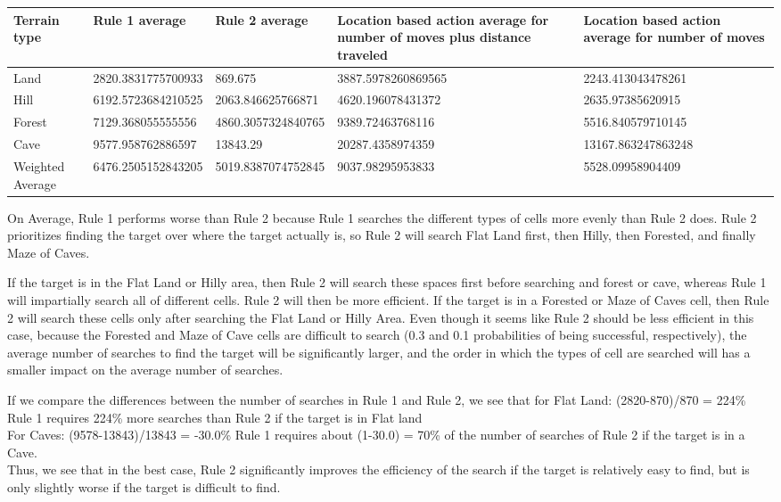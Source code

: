 \documentclass[a4paper]{article}
\begin{document}
\begin{enumerate}
\begin{center}
\begin{tabular}{|m{4em}|m{9em}|m{9em}|m{12em}|m{9em}|}
\hline
Terrain type & Rule 1 average & Rule 2 average & Location based action average for number of moves plus distance traveled & Location based action average for number of moves\\
\hline
Land & 2820.3831775700933 & 869.675 & 3887.5978260869565 & 2243.413043478261\\
\hline
Hill & 6192.5723684210525 & 2063.846625766871 & 4620.196078431372 & 2635.97385620915\\
\hline
Forest & 7129.368055555556 & 4860.3057324840765 & 9389.72463768116 & 5516.840579710145\\
\hline
Cave & 9577.958762886597 & 13843.29 & 20287.4358974359 & 13167.863247863248\\
\hline
Weighted Average & 6476.2505152843205 & 5019.8387074752845 & 9037.98295953833 & 5528.09958904409\\
\hline
\end{tabular}
\end{center}
\bigskip
\bigskip
On Average, Rule 1 performs worse than Rule 2 because Rule 1 searches the different types of cells more evenly than Rule 2 does. Rule 2 prioritizes finding the target over where the target actually is, so Rule 2 will search Flat Land first, then Hilly, then Forested, and finally Maze of Caves. 

If the target is in the Flat Land or Hilly area, then Rule 2 will search these spaces first before searching and forest or cave, whereas Rule 1 will impartially search all of different cells. Rule 2 will then be more efficient. If the target is in a Forested or Maze of Caves cell, then Rule 2 will search these cells only after searching the Flat Land or Hilly Area. Even though it seems like Rule 2 should be less efficient in this case, because the Forested and Maze of Cave cells are difficult to search (0.3 and 0.1 probabilities of being successful, respectively), the average number of searches to find the target will be significantly larger, and the order in which the types of cell are searched will has a smaller impact on the average number of searches. 

If we compare the differences between the number of searches in Rule 1 and Rule 2, we see that for Flat Land: (2820-870)/870 = 224\%\\
Rule 1 requires 224\% more searches than Rule 2 if the target is in Flat land\\
For Caves: (9578-13843)/13843 = -30.0\%
Rule 1 requires about (1-30.0) = 70\% of the number of searches of Rule 2 if the target is in a Cave.\\
Thus, we see that in the best case, Rule 2 significantly improves the efficiency of the search if the target is relatively easy to find, but is only slightly worse if the target is difficult to find.


\end{enumerate}
\end{document}
